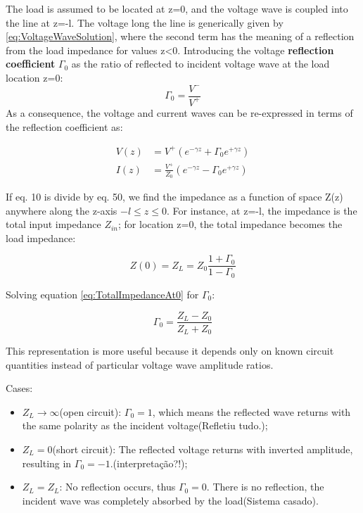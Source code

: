 \documentclass{article}
\begin{document}
The load is assumed to be located at z=0, and the voltage wave is coupled into the line at z=-l. The voltage long the line is generically given by \ref{eq:VoltageWaveSolution}, where the second term has the meaning of a reflection from the load impedance for values z<0. Introducing the voltage \textbf{reflection coefficient} \(\Gamma_0\) as the ratio of reflected to incident voltage wave at the load location z=0:
\begin{equation}
  \Gamma_0=\frac{V^-}{V^+}
  \label{eq:ReflectionCoefficient}
\end{equation}
As a consequence, the voltage and current waves can be re-expressed in terms of the reflection coefficient as:

\begin{align}
  V(z)&=V^+(e^{-\gamma z} + \Gamma_0e^{+ \gamma z})\\
  I(z)&=\frac{V^+}{Z_0}(e^{- \gamma z}-\Gamma_0e^{+\gamma z})
\end{align}

If eq. 10 is divide by eq. 50, we find the impedance as a function of space Z(z) anywhere along the z-axis \(-l\leq z \leq 0\). For instance, at z=-l, the impedance is the total input impedance \(Z_{in}\); for location z=0, the total impedance becomes the load impedance:

\begin{equation}
    Z(0)=Z_L=Z_0 \frac{1+\Gamma_0}{1-\Gamma_0}
  \label{eq:TotalImpedanceAt0}
\end{equation}

Solving equation \ref{eq:TotalImpedanceAt0} for \(\Gamma_0\):

\begin{equation}
  \Gamma_0=\frac{Z_L - Z_0}{Z_L + Z_0}
  \label{eq:ReflectionCoefficientR0}
\end{equation}

This representation is more useful because it depends only on known circuit quantities instead of particular voltage wave amplitude ratios. 

\newpage
Cases:
\begin{itemize}
  \item \(Z_L \to \infty\)(open circuit): \(\Gamma_0=1\), which means the reflected wave returns with the same polarity as the incident voltage(Refletiu tudo.);
  \item \(Z_L=0\)(short circuit): The reflected voltage returns with inverted amplitude, resulting in \(\Gamma_0 = -1\).(interpretação?!);
  \item \(Z_L=Z_L\): No reflection occurs, thus \(\Gamma_0=0\). There is no reflection, the incident wave was completely absorbed by the load(Sistema casado).
\end{itemize}
\end{document}
